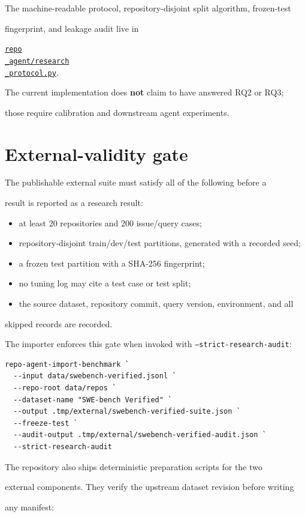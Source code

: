 \documentclass[UTF8,12pt,openany]{ctexbook}
\begin{document}
The machine-readable protocol, repository-disjoint split algorithm, frozen-test\par
fingerprint, and leakage audit live in\par
\href{../repo\_agent/research\_protocol.py}{\texttt{repo\\_agent/research\\_protocol.py}}.\par
The current implementation does \textbf{not} claim to have answered RQ2 or RQ3;\par
those require calibration and downstream agent experiments.\par

\section{External-validity gate}

The publishable external suite must satisfy all of the following before a\par
result is reported as a research result:\par

\begin{itemize}
\item at least 20 repositories and 200 issue/query cases;
\item repository-disjoint train/dev/test partitions, generated with a recorded seed;
\item a frozen test partition with a SHA-256 fingerprint;
\item no tuning log may cite a test case or test split;
\item the source dataset, repository commit, query version, environment, and all
\end{itemize}
  skipped records are recorded.\par

The importer enforces this gate when invoked with \texttt{--strict-research-audit}:\par

\begin{lstlisting}
repo-agent-import-benchmark `
  --input data/swebench-verified.jsonl `
  --repo-root data/repos `
  --dataset-name "SWE-bench Verified" `
  --output .tmp/external/swebench-verified-suite.json `
  --freeze-test `
  --audit-output .tmp/external/swebench-verified-audit.json `
  --strict-research-audit
\end{lstlisting}

The repository also ships deterministic preparation scripts for the two\par
external components. They verify the upstream dataset revision before writing\par
any manifest:\par
\end{document}
